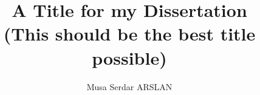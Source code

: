 \documentclass[ece,dissertation]{puthesis}
\title{A Title for my Dissertation\\
  (This should be the best title possible)}
\author{Musa Serdar ARSLAN}{Arslan, M. Serdar}
\begin{document}
\volume












\appendices









\end{document}
